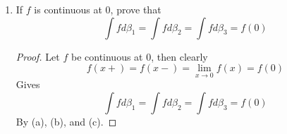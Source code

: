 \documentclass[hidelinks,12pt]{article}
\renewcommand{\leq}{\leqslant}
\begin{document}
\begin{enumerate}
\begin{enumerate}[label=(\alph*).]
\begin{proof}
\[             \]
             As required.\\
             \((\impliedby)\) Let \(\varepsilon>0\) be given and \(|f(x)-f(0)|<\varepsilon\) for \(x\in (0,\delta)\). Then, \[
             |f(x)-f(0)|\leq (M_{k}-m_{k})+(M_{k-1}-m_{k-1})<\varepsilon
             \]
             Gives that the Riemann-Stieltjes sums are epsilon-close, so \(f\in R(\beta_{3})\).
                \end{proof}
            \item If \(f\) is continuous at 0, prove that \[
            \int f d \beta_{1}=\int f d \beta_{2}=\int f d \beta_{3}=f(0)
            \]
           \begin{proof}
           Let \(f\) be continuous at 0, then clearly
           \[
           f(x+)=f(x-)=\lim_{x\to 0}f(x)=f(0)
           \]
          Gives  \[
            \int f d \beta_{1}=\int f d \beta_{2}=\int f d \beta_{3}=f(0)
        \] 
        By (a), (b), and (c).
           \end{proof} 
        \end{enumerate}
\end{enumerate}
\end{document}
